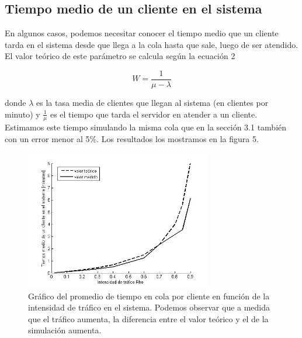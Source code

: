 \documentclass[10pt,journal,compsoc]{IEEEtran}
\begin{document}
\subsection{Tiempo medio de un cliente en el sistema} %
En algunos casos, podemos necesitar conocer el tiempo medio que un cliente tarda en el sistema desde
que llega a la cola hasta que sale, luego de ser atendido. \\
El valor te\'orico de este par\'ametro se calcula seg\'un la ecuaci\'on 2

\begin{equation}
  W = \frac{1}{\mu - \lambda}
\end{equation}

donde $\lambda$ es la tasa media de clientes que llegan al sistema (en clientes por minuto) y
$\frac{1}{\mu}$ es el tiempo que tarda el servidor en atender a un cliente.\\
Estimamos este tiempo simulando la misma cola que en la secci\'on 3.1 tambi\'en con un error menor al 5\%.
Los resultados los mostramos en la figura 5.

\begin{figure}[t]%
\label{fig:puntoccc}
\begin{center}
\centering
\includegraphics[width=3.2in]{plot_w}
\caption{Gr\'afico del promedio de tiempo en cola por cliente en funci\'on de la intensidad de tr\'afico en el sistema. Podemos observar que a medida que el tr\'afico aumenta, la diferencia entre el valor te\'orico y el de la simulaci\'on aumenta.}
\end{center}
\end{figure}

\end{document}

